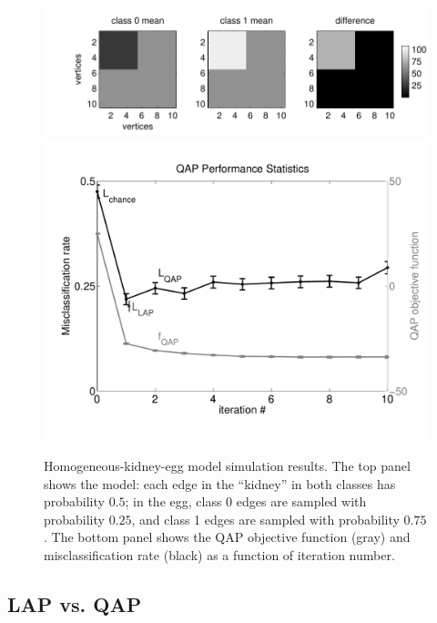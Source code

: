 \documentclass{article} %
\providecommand{\mh}[1]{\hat{#1}}
\newcommand{\qapa}{\texttt{QAP}$_1$ }
\begin{document}
\begin{figure}[htbp]
	\centering			
	\includegraphics[width=0.5\linewidth]{../figs/homo_kidney_egg_model}
	\includegraphics[width=0.4\linewidth]{../figs/homo_kidney_egg_performance}
	\caption{Homogeneous-kidney-egg model simulation results. The top panel shows the model: each edge in the ``kidney'' in both classes has probability $0.5$; in the egg, class 0 edges are sampled with probability $0.25$, and class 1 edges are sampled with probability $0.75$. The bottom panel shows the QAP objective function (gray) and misclassification rate (black) as a function of iteration number.  }
	\label{fig:homo}
\end{figure}






\subsection{LAP vs. QAP} %
\label{sub:lap_vs_qap}
\end{document}
